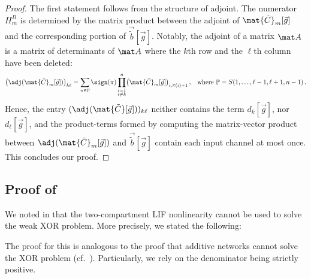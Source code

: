 \begin{proof}
The first statement follows from the structure of adjoint.
The numerator $H_m^B$ is determined by the matrix product between the adjoint of $\mat{\tilde C}_m[\vec g]$ and the corresponding portion of $\vec{\tilde b}[\vec g]$.
Notably, the adjoint of a matrix $\mat A$ is a matrix of determinants of $\mat A$ where the $k$th row and the $\ell$th column have been deleted:
\begin{align*}
	\bigl(\adj(\mat{\tilde C}_m[\vec g])\bigr)_{k\ell}
		&= \sum_{\pi \in \mathbb{P}} \sign(\pi) \prod_{\substack{i=1\\i \neq k}}^n \bigl( \mat{\tilde C}_m[\vec g] \bigr)_{i, \pi(i) + 1} \,,
	& \text{where } \mathbb{P} = S({1, \ldots, \ell - 1, \ell + 1, n - 1}) \,.
\end{align*}
Hence, the entry $(\adj(\mat{\tilde C}[\vec g]))_{k\ell}$ neither contains the term $d_{k}[\vec g]$, nor $d_{\ell}[\vec g]$, and the product-terms formed by computing the matrix-vector product between $\adj(\mat{\tilde C}_m[\vec g])$ and $\vec{\tilde b}[\vec g]$ contain each input channel at most once.
This concludes our proof.
\end{proof}

\subsection{Proof of }
\label{app:thm_two_comp_xor}

We noted in  that the two-compartment LIF nonlinearity cannot be used to solve the weak XOR problem.
More precisely, we stated the following:

\ThmTwoCompXor*

The proof for this is analogous to the proof that additive networks cannot solve the XOR problem (cf.~).
Particularly, we rely on the denominator being strictly positive.

